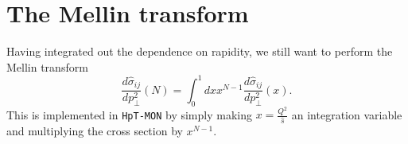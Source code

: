 \documentclass[10pt]{report}
\begin{document}
\section{The Mellin transform}
Having integrated out the dependence on rapidity, we still want to perform the Mellin transform 
\begin{equation}
\frac{d \hat{\sigma}_{i j}}{d p_\perp^2}\left(N\right)=\int_{0}^{1} d x x^{N-1} \frac{d \hat{\sigma}_{i j}}{d p_\perp^2}\left(x\right).
\end{equation}
This is implemented in \texttt{HpT-MON} by simply making $x=\frac{Q^2}{\hat{s}}$ an integration variable and multiplying the cross section by $x^{N-1}$.










\printbibliography
\end{document}
